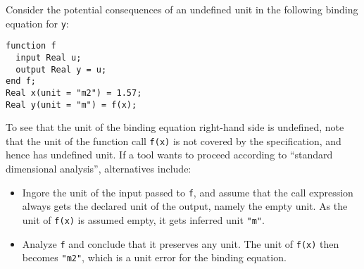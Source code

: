\begin{example}
Consider the potential consequences of an undefined unit in the following binding equation for \lstinline!y!:
\begin{lstlisting}[language=modelica]
function f
  input Real u;
  output Real y = u;
end f;
Real x(unit = "m2") = 1.57;
Real y(unit = "m") = f(x);
\end{lstlisting}
To see that the unit of the binding equation right-hand side is undefined, note that the unit of the function call \lstinline!f(x)! is not covered by the specification, and hence has undefined unit.
If a tool wants to proceed according to ``standard dimensional analysis'', alternatives include:
\begin{itemize}
\item
  Ingore the unit of the input passed to \lstinline!f!, and assume that the call expression always gets the declared unit of the output, namely the empty unit.
  As the unit of \lstinline!f(x)! is assumed empty, it gets inferred unit \lstinline!"m"!.
\item
  Analyze \lstinline!f! and conclude that it preserves any unit.
  The unit of \lstinline!f(x)! then becomes \lstinline!"m2"!, which is a unit error for the binding equation.
\end{itemize}
\end{example}
